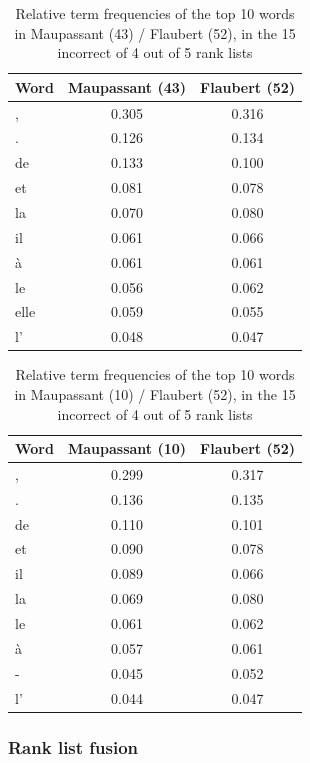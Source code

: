 \begin{table}
  \caption{Relative term frequencies of the top 10 words in Maupassant (43) / Flaubert (52), in the 15 incorrect of 4 out of 5 rank lists}
  \centering
  \label{tab:errors2}
  \begin{tabular}{l c c}
      \toprule
      Word & Maupassant (43) & Flaubert (52) \\
      \midrule
      , & 0.305 & 0.316 \\
      . & 0.126 & 0.134 \\
      de & 0.133 & 0.100 \\
      et & 0.081 & 0.078 \\
      la & 0.070 & 0.080 \\
      il & 0.061 & 0.066 \\
      à & 0.061 & 0.061 \\
      le & 0.056 & 0.062 \\
      elle & 0.059 & 0.055 \\
      l' & 0.048 & 0.047 \\
      \bottomrule
  \end{tabular}
\end{table}

\begin{table}
  \caption{Relative term frequencies of the top 10 words in Maupassant (10) / Flaubert (52), in the 15 incorrect of 4 out of 5 rank lists}
  \centering
  \label{tab:errors3}
  \begin{tabular}{l c c}
      \toprule
      Word & Maupassant (10) & Flaubert (52) \\
      \midrule
      , & 0.299 & 0.317 \\
      . & 0.136 & 0.135 \\
      de & 0.110 & 0.101 \\
      et & 0.090 & 0.078 \\
      il & 0.089 & 0.066 \\
      la & 0.069 & 0.080 \\
      le & 0.061 & 0.062 \\
      à & 0.057 & 0.061 \\
      - & 0.045 & 0.052 \\
      l' & 0.044 & 0.047 \\
      \bottomrule
  \end{tabular}
\end{table}


\subsubsection{Rank list fusion}

